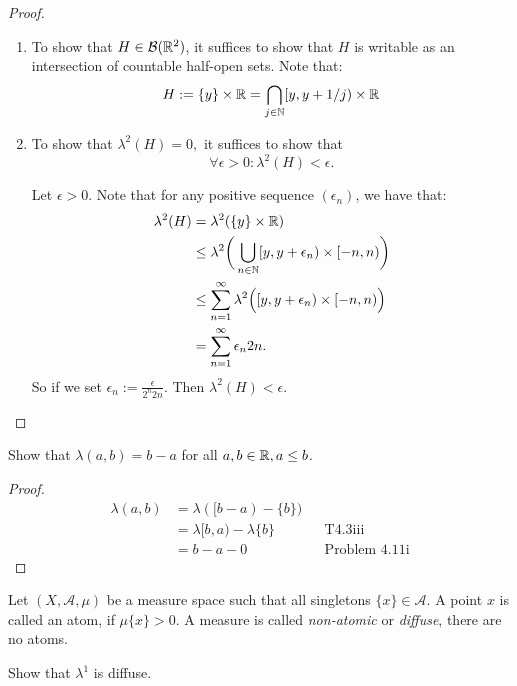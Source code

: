 \begin{proof}
\begin{enumerate}
  \item To show that \(H\in \mathcal{B}(\Bbb{R}^2)\), it suffices to show that \(H\) is writable as an intersection of countable half-open sets.
Note that:
\[
H:=\{y\}\times\Bbb{R}=\bigcap _{j\in \Bbb{N}} [y,y+1/j)\times\Bbb{R}
\]
  \item To show that \(\lambda ^2(H)=0,\) it suffices to show that
\[
\forall \epsilon>0: \lambda ^2(H)<\epsilon.
\]

Let \(\epsilon>0\). Note that for any positive sequence \((\epsilon_{n})\), we have that:
\begin{align*}
\lambda ^2(H)&=\lambda ^{2} (\{y\} \times\Bbb{R}) \\
&\leq \lambda ^2\bigg(\bigcup _{n\in \Bbb{N}}[y,y+\epsilon_{n})\times[-n,n) \bigg)\\
&\leq \sum _{n=1}^\infty  \lambda ^2\Big([y,y+\epsilon_{n})\times[-n,n) \Big) \\
&=\sum _{n=1}^\infty \epsilon_{n} 2n.
\end{align*}
So if we set \(\epsilon_{n}:=\frac{\epsilon}{2^n2n}\). Then \(\lambda ^2(H)<\epsilon.\)
\end{enumerate}
\end{proof}
\newpage
\begin{thm}[Problem 6.4i]
Show that \(\lambda (a,b)=b-a\) for all \(a,b\in \Bbb{R},\space a\leq b\).
\end{thm}

\begin{proof}
\begin{align*}
\lambda (a,b) &=\lambda ([b-a)-\{b\}) \\
&=\lambda [b,a)-\lambda \{b\} &&\text{T4.3iii} \\
&=b-a-0 && \text{Problem 4.11i}
\end{align*}
\end{proof}

\begin{defn}
Let \((X,\mathcal{A},\mu )\) be a measure space such that all singletons \(\{x\}\in \mathcal{A}.\) A point \(x\) is called an atom, if \(\mu \{x\}>0.\) A measure is called \emph{non-atomic} or \emph{diffuse}, there are no atoms.
\end{defn}

\begin{thm}[Problem 6.5i]
Show that \(\lambda ^{1}\) is diffuse.
\end{thm}

